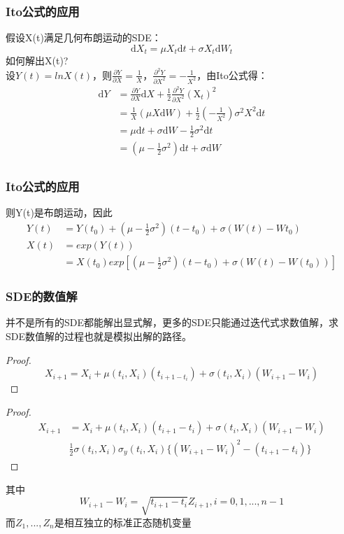 \documentclass{ctexbeamer}
\renewcommand{\proofname}{标准布朗运动的数学性质}
\begin{document}
	\begin{frame}
		\frametitle{Ito公式的应用}
		\footnotesize
		假设X(t)满足几何布朗运动的SDE：$$\mathrm{d}X_t = \mu X_t\mathrm{d}t + \sigma X_t\mathrm{d}W_t$$
		如何解出X(t)?\\
		设$Y(t) = lnX(t)$，则$\frac{\partial Y}{\partial X} = \frac{1}{X}$，$\frac{\partial^2Y}{\partial X^2} = -\frac{1}{X^2}$，由Ito公式得：
		\begin{align}
			\mathrm{d}Y &= \frac{\partial Y}{\partial X}\mathrm{d}X + \frac{1}{2}\frac{\partial^2Y}{\partial X^2}(\mathrm X_t)^2\\
					&= \frac{1}{X}(\mu X\mathrm{d}W) + \frac{1}{2}(-\frac{1}{X^2})\sigma^2X^2\mathrm{d}t\\
					&= \mu \mathrm{d}t + \sigma \mathrm{d}W - \frac{1}{2}\sigma^2\mathrm{d}t\\
					&= (\mu-\frac{1}{2}\sigma^2)\mathrm{d}t + \sigma\mathrm{d}W\\
		\end{align}


	\end{frame}

	\begin{frame}
	\frametitle{Ito公式的应用}
	\footnotesize
	则Y(t)是布朗运动，因此
	\begin{align}
Y(t) &= Y(t_0)+(\mu-\frac{1}{2}\sigma^2)(t-t_0) + \sigma(W(t)-W{t_0})\\
	X(t) &= exp(Y(t))\\
	   &= X(t_0)exp[(\mu-\frac{1}{2}\sigma^2)(t-t_0)+\sigma(W(t)-W(t_0))]
	\end{align}

	\end{frame}

	\begin{frame}

	\frametitle{SDE的数值解}
	\footnotesize
	
	并不是所有的SDE都能解出显式解，更多的SDE只能通过迭代式求数值解，求SDE数值解的过程也就是模拟出解的路径。
	\renewcommand{\proofname}{Euler格式}
	\begin{proof}
	$$X_{i+1} = X_i + \mu (t_i,X_i)(t_{i+1-t_i}) + \sigma(t_i,X_i)(W_{i+1}-W_i)$$
	\end{proof}

	\renewcommand{\proofname}{Milstein格式}
	\begin{proof}
	\begin{align}
	X_{i+1} &= X_i + \mu (t_i,X_i)(t_{i+1}-t_i)+\sigma (t_i,X_i)(W_{i+1}-W_i)\\
			&\frac{1}{2}\sigma(t_i,X_i)\sigma_y(t_i,X_i)\{(W_{i+1}-W_i)^2-(t_{i+1}-t_i)\}
	\end{align}

	\end{proof}

	其中$$W_{i+1}-W_i = \sqrt{t_{i+1}-t_i}Z_{i+1}, i=0,1,...,n-1$$
	而$Z_1,...,Z_n$是相互独立的标准正态随机变量

	\end{frame}
\end{document}
